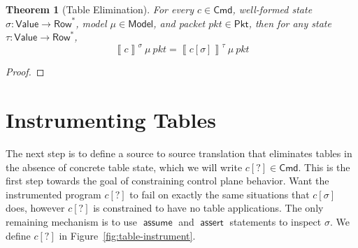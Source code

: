 \documentclass{article}
\newcommand{\pkt}{\mathit{pkt}}
\newcommand{\denote}[1]{\left\llbracket#1\right\rrbracket}
\newcommand{\Value}{\mathsf{Value}}
\newcommand{\Cmd}{\mathsf{Cmd}}
\newcommand{\Pkt}{\mathsf{Pkt}}
\newcommand{\Model}{\mathsf{Model}}
\newcommand{\Row}{\mathsf{Row}}
\newcommand{\assert}{\mathop{\mathsf{assert}}}
\newcommand{\assume}{\mathop{\mathsf{assume}}}
\newtheorem{theorem}{Theorem}
\begin{document}
\begin{theorem}[Table Elimination]
  For every $c \in \Cmd$, well-formed state $\sigma : \Value \to \Row^*$, model
  $\mu \in \Model$, and packet $\pkt \in \Pkt$, then for any state $\tau :
  \Value \to \Row^*$,
  \[\denote{c}^\sigma~\mu~\pkt = \denote{c[\sigma]}^\tau~\mu~\pkt\]
\end{theorem}
\begin{proof}
\end{proof}


\section{Instrumenting Tables}

The next step is to define a source to source translation that eliminates tables
in the absence of concrete table state, which we will write $c[?] \in \Cmd$.
This is the first step towards the goal of constraining control plane behavior.
Want the instrumented program $c[?]$ to fail on exactly the same situations that
$c[\sigma]$ does, however $c[?]$ is constrained to have no table applications.
The only remaining mechanism is to use $\assume$ and $\assert$ statements to
inspect $\sigma$. We define $c[?]$ in Figure~\ref{fig:table-instrument}.
\end{document}
